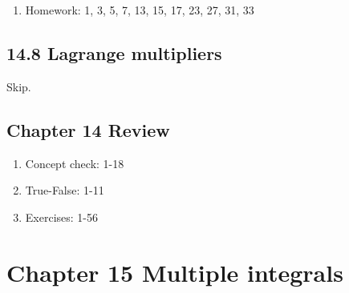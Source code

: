 \documentclass{article}
\begin{document}
\begin{enumerate}
\item Homework: 1, 3, 5, 7, 13, 15, 17, 23, 27, 31, 33

\end{enumerate}


\subsection{14.8 Lagrange multipliers}
Skip.

\subsection{Chapter 14 Review}
\begin{enumerate}
\item Concept check: 1-18
\item True-False: 1-11
\item Exercises: 1-56
\end{enumerate}

\section{Chapter 15 Multiple integrals}
\end{document}
